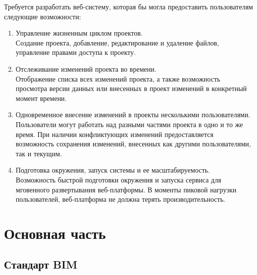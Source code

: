 \documentclass[a4paper,14pt]{extreport} %
\begin{document}
Требуется разработать веб-систему, которая бы могла предоставить пользователям следующие возможности:
\begin{enumerate}
\item Управление жизненным циклом проектов. \\
Создание проекта, добавление, редактирование  и удаление файлов, управление правами доступа к проекту.
\item Отслеживание изменений проекта во времени. \\
Отображение списка всех изменений проекта, а также возможность просмотра версии данных или внесенных в проект изменений в конкретный момент времени.
\item Одновременное внесение изменений в проекты несколькими пользователями. \\
Пользователи могут работать над разными частями проекта в одно и то же время. При наличии конфликтующих изменений предоставляется возможность сохранения изменений, внесенных как другими пользователями, так и текущим.
\item Подготовка окружения, запуск системы и ее масштабируемость. \\
Возможность быстрой подготовки окружения и запуска сервиса для мговенного развертывания веб-платформы. В моменты пиковой нагрузки пользователей, веб-платформа не должна терять производительность.
\end{enumerate}

\newpage

\chapter{Основная часть}
\section{Стандарт BIM}
\end{document}
